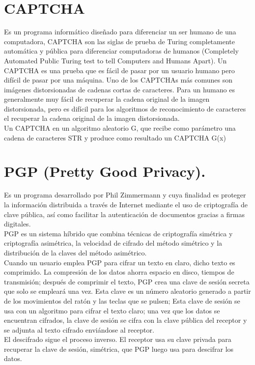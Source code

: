 \documentclass[12pt,oneside,onecolumn,openany]{report}
\begin{document}
\section{CAPTCHA}
 Es un programa informático diseñado para diferenciar un ser humano de una computadora, CAPTCHA son las siglas de prueba de Turing completamente automática y pública para diferenciar computadoras de humanos (Completely Automated Public Turing test to tell Computers and Humans Apart).  Un CAPTCHA es una prueba que es fácil de pasar por un usuario humano pero difícil de pasar por una máquina. Uno de los CAPTCHAs más comunes son imágenes distorsionadas de cadenas cortas de caracteres. Para un humano es generalmente muy fácil de recuperar la cadena original de la imagen distorsionada, pero es difícil para  los algoritmos de reconocimiento de caracteres el recuperar la cadena original de la imagen distorsionada.\\
Un CAPTCHA en un algoritmo aleatorio G, que recibe como parámetro una cadena de caracteres STR y produce como resultado un CAPTCHA G(x)\\
 
 
\section{PGP (Pretty Good Privacy).}
Es un programa desarrollado por Phil Zimmermann y cuya finalidad es proteger la información distribuida a través de Internet mediante el uso de criptografía de clave pública, así como facilitar la autenticación de documentos gracias a firmas digitales.\\
PGP es un sistema híbrido que combina técnicas de criptografía simétrica y criptografía asimétrica, la velocidad de cifrado del método simétrico y la distribución de la claves del método asimétrico.\\
Cuando un usuario emplea PGP para cifrar un texto en claro, dicho texto es comprimido. La compresión de los datos ahorra espacio en disco, tiempos de transmisión; después de comprimir el texto, PGP crea una clave de sesión secreta que solo se empleará una vez. Esta clave es un número aleatorio generado a partir de los movimientos del ratón y las teclas que se pulsen; Esta clave de sesión se usa con un algoritmo para cifrar el texto claro; una vez que los datos se encuentran cifrados, la clave de sesión se cifra con la clave pública del receptor y se adjunta al texto cifrado enviándose al receptor.\\
El descifrado sigue el proceso inverso. El receptor usa su clave privada para recuperar la clave de sesión, simétrica, que PGP luego usa para descifrar los datos.\cite{pgp}\\
\end{document}

